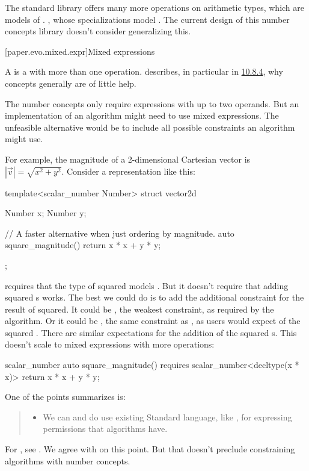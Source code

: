 \pnum
The \Cpp{} standard library offers many more operations on arithmetic types,
which are models of .
,
whose specializations model .
The current design of this number concepts library doesn't consider generalizing this.

\pnum
\wheredevelisat

[paper.evo.mixed.expr]{Mixed expressions}

\pnum
A  is a  with more than one operation.
\hrefVI{} describes,
in particular in \href{https://wg21.link/P1673R12#generalizing-associativity-helps-little}{10.8.4},
why concepts generally are of little help.

\pnum
The number concepts only require expressions with up to two operands.
But an implementation of an algorithm might need to use mixed expressions.
The unfeasible alternative would be to include all possible constraints an algorithm might use.

\pnum
For example, the magnitude of a 2-dimensional Cartesian vector is $|\vec{v}| = \sqrt{x^2 + y^2}$.
Consider a \Cpp{} representation like this:
\begin{codeblock}
template<scalar_number Number>
struct vector2d {
  Number x;
  Number y;

  // A faster alternative when just ordering by magnitude.
  auto square_magnitude() { return x * x + y * y; }
};
\end{codeblock}
 requires that the type of  squared models .
But it doesn't require that adding squared s works.
The best we could do is to add the additional constraint for the result of  squared.
It could be , the weakest constraint, as required by the algorithm.
Or it could be , the same constraint as , as users would expect of the squared .
There are similar expectations for the addition of the squared s.
This doesn't scale to mixed expressions with more operations:
\begin{codeblock}
scalar_number auto square_magnitude() requires scalar_number<decltype(x * x)> {
  return x * x + y * y;
}
\end{codeblock}

\pnum
One of the points \hrefVI{} summarizes is:
\begin{quote}
\begin{itemize}
\item
We can and do use existing Standard language, like ,
for expressing permissions that algorithms have.
\end{itemize}
\end{quote}
For , see .
We agree with \hrefVI{} on this point.
But that doesn't preclude constraining algorithms with number concepts.

